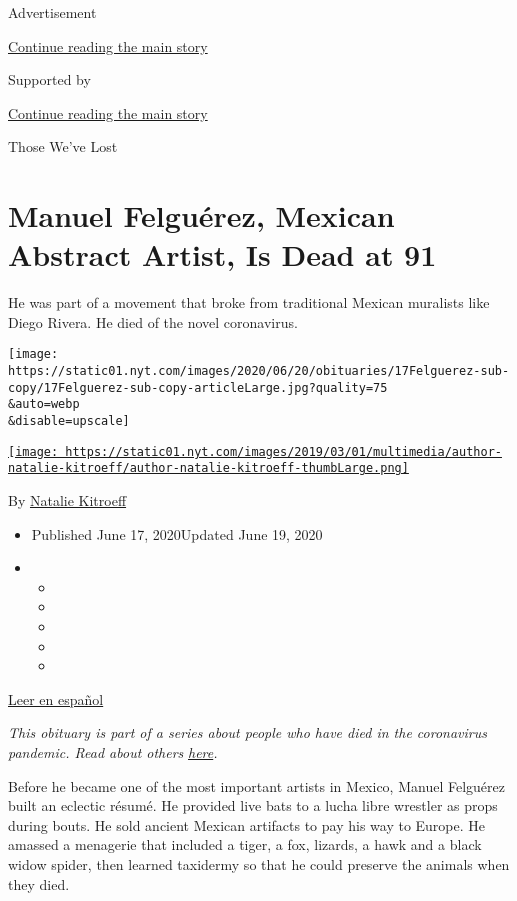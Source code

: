 Advertisement

\protect\hyperlink{after-top}{Continue reading the main story}

Supported by

\protect\hyperlink{after-sponsor}{Continue reading the main story}

Those We've Lost

\hypertarget{manuel-felguuxe9rez-mexican-abstract-artist-is-dead-at-91}{%
\section{Manuel Felguérez, Mexican Abstract Artist, Is Dead at
91}\label{manuel-felguuxe9rez-mexican-abstract-artist-is-dead-at-91}}

He was part of a movement that broke from traditional Mexican muralists
like Diego Rivera. He died of the novel coronavirus.

\texttt{[image: https://static01.nyt.com/images/2020/06/20/obituaries/17Felguerez-sub-copy/17Felguerez-sub-copy-articleLarge.jpg?quality=75\\\&auto=webp\\\&disable=upscale]}

\href{https://www.nytimes.com/by/natalie-kitroeff}{\texttt{[image: https://static01.nyt.com/images/2019/03/01/multimedia/author-natalie-kitroeff/author-natalie-kitroeff-thumbLarge.png]}}

By \href{https://www.nytimes.com/by/natalie-kitroeff}{Natalie Kitroeff}

\begin{itemize}
\item
  Published June 17, 2020Updated June 19, 2020
\item
  \begin{itemize}
  \item
  \item
  \item
  \item
  \item
  \end{itemize}
\end{itemize}

\href{https://www.nytimes.com/es/2020/06/18/espanol/cultura/muere-covid-manuel-felguerez.html}{Leer
en español}

\emph{This obituary is part of a series about people who have died in
the coronavirus pandemic. Read about others}
\href{https://www.nytimes.com/interactive/2020/obituaries/people-died-coronavirus-obituaries.html}{\emph{here}}\emph{.}

Before he became one of the most important artists in Mexico, Manuel
Felguérez built an eclectic résumé. He provided live bats to a lucha
libre wrestler as props during bouts. He sold ancient Mexican artifacts
to pay his way to Europe. He amassed a menagerie that included a tiger,
a fox, lizards, a hawk and a black widow spider, then learned taxidermy
so that he could preserve the animals when they died.

